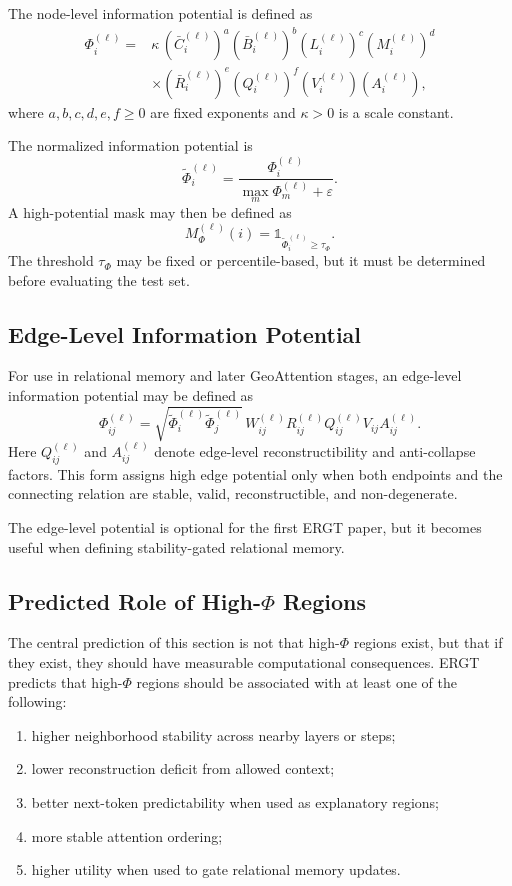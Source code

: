 \documentclass[11pt]{article}
\begin{document}
The node-level information potential is defined as
\[
\begin{aligned}
\Phi_i^{(\ell)}
={}&
\kappa\,
(\bar{C}_i^{(\ell)})^a
(\bar{B}_i^{(\ell)})^b
(L_i^{(\ell)})^c
(M_i^{(\ell)})^d \\
&\times
(\bar{R}_i^{(\ell)})^e
(Q_i^{(\ell)})^f
(V_i^{(\ell)})
(A_i^{(\ell)}),
\end{aligned}
\]
where $a,b,c,d,e,f\geq 0$ are fixed exponents and $\kappa>0$ is a scale constant.

The normalized information potential is
\[
\widetilde{\Phi}_i^{(\ell)}
=
\frac{\Phi_i^{(\ell)}}{\max_m\Phi_m^{(\ell)}+\varepsilon}.
\]
A high-potential mask may then be defined as
\[
M_{\Phi}^{(\ell)}(i)=
\mathbb{1}_{\widetilde{\Phi}_i^{(\ell)}\geq\tau_{\Phi}}.
\]
The threshold $\tau_{\Phi}$ may be fixed or percentile-based, but it must be determined before evaluating the test set.

\subsection{Edge-Level Information Potential}

For use in relational memory and later GeoAttention stages, an edge-level information potential may be defined as
\[
\Phi_{ij}^{(\ell)}
=
\sqrt{\widetilde{\Phi}_i^{(\ell)}\widetilde{\Phi}_j^{(\ell)}}\,
W_{ij}^{(\ell)}R_{ij}^{(\ell)}Q_{ij}^{(\ell)}V_{ij}A_{ij}^{(\ell)}.
\]
Here $Q_{ij}^{(\ell)}$ and $A_{ij}^{(\ell)}$ denote edge-level reconstructibility and anti-collapse factors. This form assigns high edge potential only when both endpoints and the connecting relation are stable, valid, reconstructible, and non-degenerate.

The edge-level potential is optional for the first ERGT paper, but it becomes useful when defining stability-gated relational memory.

\subsection{Predicted Role of High-$\Phi$ Regions}

The central prediction of this section is not that high-$\Phi$ regions exist, but that if they exist, they should have measurable computational consequences. ERGT predicts that high-$\Phi$ regions should be associated with at least one of the following:
\begin{enumerate}[label=(\roman*)]
    \item higher neighborhood stability across nearby layers or steps;
    \item lower reconstruction deficit from allowed context;
    \item better next-token predictability when used as explanatory regions;
    \item more stable attention ordering;
    \item higher utility when used to gate relational memory updates.
\end{enumerate}
\end{document}
